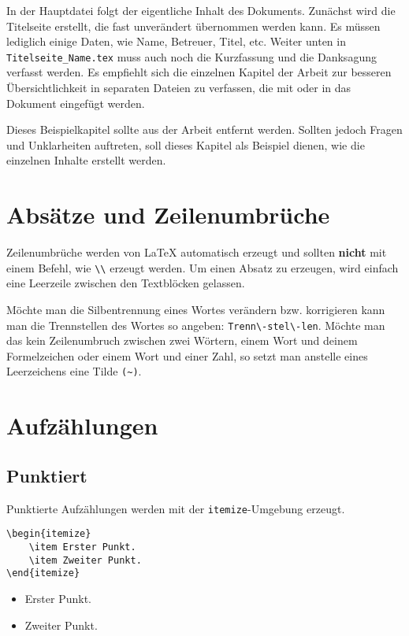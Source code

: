 In der Hauptdatei folgt der eigentliche Inhalt des Dokuments. Zunächst wird die Titelseite erstellt, die fast unverändert übernommen werden kann. Es müssen lediglich einige Daten, wie Name, Betreuer, Titel, etc. Weiter unten in \verb|Titelseite_Name.tex| muss auch noch die Kurzfassung und die Danksagung verfasst werden. Es empfiehlt sich die einzelnen Kapitel der Arbeit zur besseren Übersichtlichkeit in separaten Dateien zu verfassen, die mit \verb|| oder \verb|| in das Dokument eingefügt werden. 

Dieses Beispielkapitel sollte aus der Arbeit entfernt werden. Sollten jedoch Fragen und Unklarheiten auftreten, soll dieses Kapitel als Beispiel dienen, wie die einzelnen Inhalte erstellt werden.

\section{Absätze und Zeilenumbrüche}
Zeilenumbrüche werden von \LaTeX{} automatisch erzeugt und sollten \textbf{nicht} mit einem Befehl, wie \verb|\\| erzeugt werden. Um einen Absatz zu erzeugen, wird einfach eine Leerzeile zwischen den Textblöcken gelassen.

Möchte man die Silbentrennung eines Wortes verändern bzw. korrigieren kann man die Trennstellen des Wortes so angeben: \verb|Trenn\-stel\-len|. Möchte man das kein Zeilenumbruch zwischen zwei Wörtern, einem Wort und deinem Formelzeichen oder einem Wort und einer Zahl, so setzt man anstelle eines Leerzeichens eine Tilde \verb|(~)|.

\section{Aufzählungen}
\subsection{Punktiert}
Punktierte Aufzählungen werden mit der \verb|itemize|-Umgebung erzeugt.
\begin{lstlisting}[style=latex]
\begin{itemize}
	\item Erster Punkt.
	\item Zweiter Punkt.
\end{itemize}
\end{lstlisting}
\begin{itemize}
	\item Erster Punkt.
	\item Zweiter Punkt.
\end{itemize}
